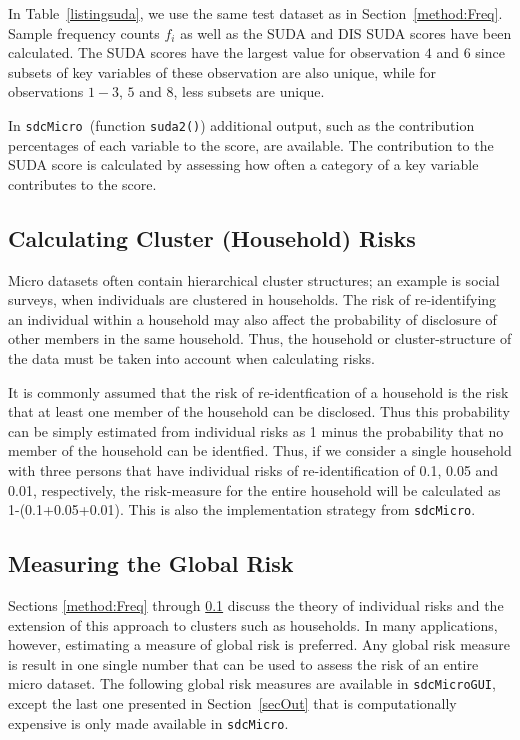 \documentclass[12pt]{scrartcl}\usepackage[]{graphicx}\usepackage[]{color}
\newcommand{\sdcMicro}{\texttt{sdcMicro}}
\newcommand{\sdcMicroGUI}{\texttt{sdcMicroGUI}}
\begin{document}
In Table~\ref{listingsuda}, we use the same test dataset as in Section~\ref{method:Freq}. Sample frequency counts  $f_i$ as well as the SUDA and DIS SUDA scores have been calculated. The SUDA scores have the largest value for observation $4$ and $6$ since subsets of key variables of these observation are also unique, while for observations $1-3$, $5$ and $8$, less subsets are unique.

In \sdcMicro \ (function \lstinline{suda2()}) additional output, such as the contribution percentages of each variable to the score, are available. The contribution to the SUDA score is calculated by assessing how often a category of a key variable contributes to the score.

\subsection{Calculating Cluster (Household) Risks} \label{sub:householdrisk}
Micro datasets often contain hierarchical cluster structures; an example is social surveys, when individuals are clustered in households. The risk of re-identifying an individual within a household may also affect the probability of disclosure of other members in the same household. Thus, the household or cluster-structure of the data must be taken into account when calculating risks.

It is commonly assumed that the risk of re-identfication of a household is the risk that at least one member of the household can be disclosed. Thus this probability can be simply estimated from individual risks as 1 minus the probability that no member of the household can be identfied. Thus, if we consider a single household with three persons that have individual risks of re-identification of 0.1, 0.05 and 0.01, respectively, the risk-measure for the entire household will be calculated as 1-(0.1+0.05+0.01). This is also the implementation strategy from \sdcMicro.

\subsection{Measuring the Global Risk}
Sections \ref{method:Freq} through  \ref{sub:householdrisk} discuss the theory of individual risks and the extension of this approach to clusters such as households. In many applications, however, estimating a measure of global risk is preferred. Any global risk measure is result in one single number that can be used to assess the risk of an entire micro dataset. The following global risk measures are available in \sdcMicroGUI , except the last one presented in Section~\ref{secOut} that is computationally expensive is only made available in \sdcMicro .
\end{document}
